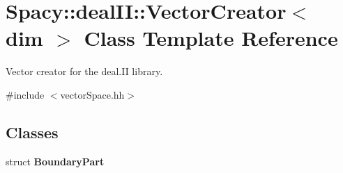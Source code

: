 \hypertarget{classSpacy_1_1dealII_1_1VectorCreator}{\section{\-Spacy\-:\-:deal\-I\-I\-:\-:\-Vector\-Creator$<$ dim $>$ \-Class \-Template \-Reference}
\label{classSpacy_1_1dealII_1_1VectorCreator}
}


\-Vector creator for the deal.\-I\-I library.  




{\ttfamily \#include $<$vector\-Space.\-hh$>$}

\subsection*{\-Classes}
\begin{DoxyCompactItemize}
\item 
struct {\bfseries \-Boundary\-Part}
\end{DoxyCompactItemize}
